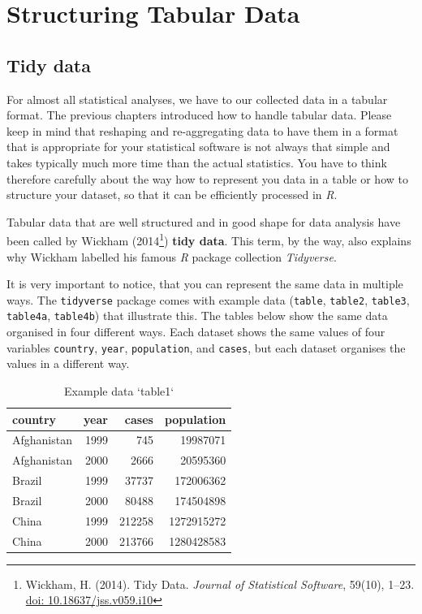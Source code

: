 \documentclass[
]{scrartcl}
\begin{document}
\section{Structuring Tabular Data}\label{structuring-tabular-data}

\subsection{Tidy data}\label{tidy-data}

For almost all statistical analyses, we have to our collected data in a tabular format. The previous chapters introduced how to handle tabular data. Please keep in mind that reshaping and re-aggregating data to have them in a format that is appropriate for your statistical software is not always that simple and takes typically much more time than the actual statistics. You have to think therefore carefully about the way how to represent you data in a table or how to structure your dataset, so that it can be efficiently processed in \emph{R}.

Tabular data that are well structured and in good shape for data analysis have been called by Wickham (2014\footnote{Wickham, H. (2014). Tidy Data. \emph{Journal of Statistical Software}, 59(10), 1--23. \href{https://www.jstatsoft.org/v059/i10}{doi: 10.18637/jss.v059.i10}}) \textbf{tidy data}. This term, by the way, also explains why Wickham labelled his famous \emph{R} package collection \emph{Tidyverse}.

It is very important to notice, that you can represent the same data in multiple ways. The \texttt{tidyverse} package comes with example data (\texttt{table}, \texttt{table2}, \texttt{table3}, \texttt{table4a}, \texttt{table4b}) that illustrate this. The tables below show the same data organised in four different ways. Each dataset shows the same values of four variables \texttt{country}, \texttt{year}, \texttt{population}, and \texttt{cases}, but each dataset organises the values in a different way.

\begin{longtable}[t]{lrrr}
\caption{\label{tab:tab1}Example data `table1`}\\
\toprule
country & year & cases & population\\
\midrule
Afghanistan & 1999 & 745 & 19987071\\
Afghanistan & 2000 & 2666 & 20595360\\
Brazil & 1999 & 37737 & 172006362\\
Brazil & 2000 & 80488 & 174504898\\
China & 1999 & 212258 & 1272915272\\
\addlinespace
China & 2000 & 213766 & 1280428583\\
\bottomrule
\end{longtable}
\end{document}
